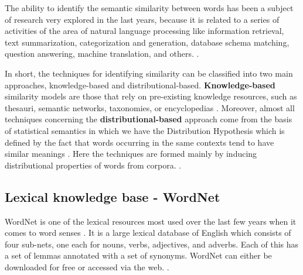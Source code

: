 
The ability to identify the semantic similarity between words has been a subject of research very explored in the last years, because it is related to a series of activities of the area of natural language processing like information retrieval, text summarization, categorization and generation, database schema matching, question answering, machine translation, and others. \cite{Islam2007ApplicationsOC, Jurafsky:2009:SLP:1214993}. 

In short, the techniques for identifying similarity can be classified into two main approaches, knowledge-based and distributional-based. \textbf{Knowledge-based} similarity models are those that rely on pre-existing knowledge resources, such as thesauri, semantic networks, taxonomies, or encyclopedias \cite{Agirre2009}. Moreover, almost all techniques concerning the \textbf{distributional-based} approach come from the basis of statistical semantics in which we have the Distribution Hypothesis which is defined by the fact that words occurring in the same contexts tend to have similar meanings \cite{Harris1954}. Here the techniques are formed mainly by inducing distributional properties of words from corpora. \cite{Agirre2009}.

\subsection{Lexical knowledge base - WordNet}\label{chap:background:wordnet}

WordNet is one of the lexical resources most used over the last few years when it comes to word senses \cite{fellbaum1998}. It is a large lexical database of English which consists of four sub-nets, one each for nouns, verbs, adjectives, and adverbs. Each of this has a set of lemmas annotated with a set of synonyms. WordNet can either be downloaded for free or accessed via the web. \cite{wordnetOnline2010}.

